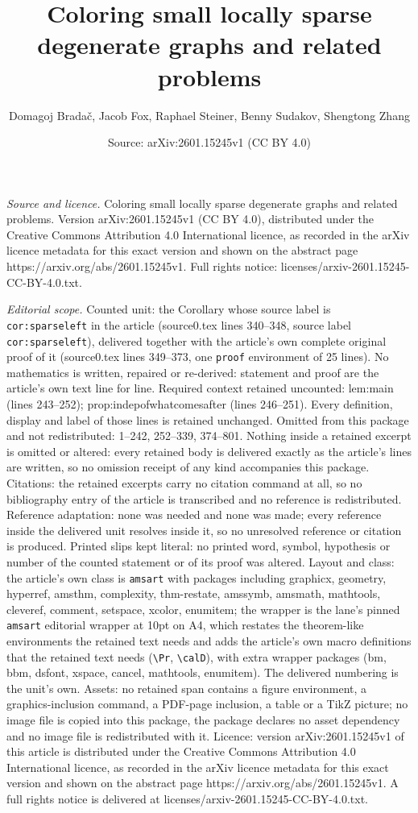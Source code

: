 \documentclass[10pt,a4paper]{amsart}
\title[Coloring small locally sparse degenerate graphs and related ]{Coloring small locally sparse degenerate graphs and related problems}
\author{Domagoj Brada\v{c}, Jacob Fox, Raphael Steiner, Benny Sudakov, Shengtong Zhang}
\date{Source: arXiv:2601.15245v1 (CC BY 4.0)}
\begin{document}
\maketitle

\noindent\emph{Source and licence.} Coloring small locally sparse degenerate graphs and related problems. Version arXiv:2601.15245v1 (CC BY 4.0), distributed under the Creative Commons Attribution 4.0 International licence, as recorded in the arXiv licence metadata for this exact version and shown on the abstract page https://arxiv.org/abs/2601.15245v1. Full rights notice: licenses/arxiv-2601.15245-CC-BY-4.0.txt.\par\smallskip

\noindent\textit{Editorial scope.} Counted unit: the Corollary whose source label is \texttt{cor:sparseleft} in the article (source0.tex lines 340--348, source label \texttt{cor:sparseleft}), delivered together with the article's own complete original proof of it (source0.tex lines 349--373, one \texttt{proof} environment of 25 lines). No mathematics is written, repaired or re-derived: statement and proof are the article's own text line for line. Required context retained uncounted: lem:main (lines 243--252); prop:indepofwhatcomesafter (lines 246--251). Every definition, display and label of those lines is retained unchanged. Omitted from this package and not redistributed: 1--242, 252--339, 374--801. Nothing inside a retained excerpt is omitted or altered: every retained body is delivered exactly as the article's lines are written, so no omission receipt of any kind accompanies this package. Citations: the retained excerpts carry no citation command at all, so no bibliography entry of the article is transcribed and no reference is redistributed. Reference adaptation: none was needed and none was made; every reference inside the delivered unit resolves inside it, so no unresolved reference or citation is produced. Printed slips kept literal: no printed word, symbol, hypothesis or number of the counted statement or of its proof was altered. Layout and class: the article's own class is \texttt{amsart} with packages including graphicx, geometry, hyperref, amsthm, complexity, thm-restate, amssymb, amsmath, mathtools, cleveref, comment, setspace, xcolor, enumitem; the wrapper is the lane's pinned \texttt{amsart} editorial wrapper at 10pt on A4, which restates the theorem-like environments the retained text needs and adds the article's own macro definitions that the retained text needs (\texttt{\textbackslash Pr}, \texttt{\textbackslash calD}), with extra wrapper packages (bm, bbm, dsfont, xspace, cancel, mathtools, enumitem). The delivered numbering is the unit's own. Assets: no retained span contains a figure environment, a graphics-inclusion command, a PDF-page inclusion, a table or a TikZ picture; no image file is copied into this package, the package declares no asset dependency and no image file is redistributed with it. Licence: version arXiv:2601.15245v1 of this article is distributed under the Creative Commons Attribution 4.0 International licence, as recorded in the arXiv licence metadata for this exact version and shown on the abstract page https://arxiv.org/abs/2601.15245v1. A full rights notice is delivered at licenses/arxiv-2601.15245-CC-BY-4.0.txt. 
\end{document}
